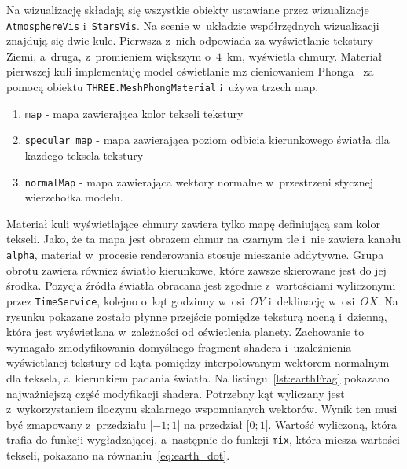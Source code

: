 Na wizualizację składają się wszystkie obiekty ustawiane przez wizualizacje \texttt{AtmosphereVis} i~\texttt{StarsVis}. Na scenie w~układzie współrzędnych wizualizacji znajdują się dwie kule. Pierwsza z~nich odpowiada za wyświetlanie tekstury Ziemi, a~druga, z~promieniem większym o~$4$~km, wyświetla chmury. Materiał pierwszej kuli implementuję model oświetlanie mz cieniowaniem Phonga~\cite[Rozdział 3]{RealTime3DGraphics} za pomocą obiektu \texttt{THREE.MeshPhongMaterial} i~używa trzech map.
\begin{samepage}
\begin{enumerate}
  \item \texttt{map} - mapa zawierająca kolor tekseli tekstury
  \item \texttt{specular map} - mapa zawierająca poziom odbicia kierunkowego światła dla każdego teksela tekstury
  \item \texttt{normalMap} - mapa zawierająca wektory normalne w~przestrzeni stycznej wierzchołka modelu.
\end{enumerate}
\end{samepage}
Materiał kuli wyświetlające chmury zawiera tylko mapę definiującą sam kolor tekseli. Jako, że ta mapa jest obrazem chmur na czarnym tle i~nie zawiera kanału \texttt{alpha}, materiał w~procesie renderowania stosuje mieszanie addytywne. Grupa obrotu zawiera również światło kierunkowe, które zawsze skierowane jest do jej środka. Pozycja źródła światła obracana jest zgodnie z~wartościami wyliczonymi przez \texttt{TimeService}, kolejno o~kąt godzinny w~osi~$OY$ i~deklinację w~osi~$OX$. Na rysunku pokazane zostało płynne przejście pomiędze teksturą nocną i~dzienną, która jest wyświetlana w~zależności od oświetlenia planety. Zachowanie to wymagało zmodyfikowania domyślnego fragment shadera i~uzależnienia wyświetlanej tekstury od kąta pomiędzy interpolowanym wektorem normalnym dla teksela, a~kierunkiem padania światła. Na listingu~\ref{lst:earthFrag} pokazano najważniejszą część modyfikacji shadera. Potrzebny kąt wyliczany jest z~wykorzystaniem iloczynu skalarnego wspomnianych wektorów. Wynik ten musi być zmapowany z~przedziału $\lbrack-1; 1\rbrack$ na przedział $\lbrack0; 1\rbrack$. Wartość wyliczoną, która trafia do funkcji wygładzającej, a~następnie do funkcji \texttt{mix}, która miesza wartości tekseli, pokazano na równaniu~\ref{eq:earth_dot}.

